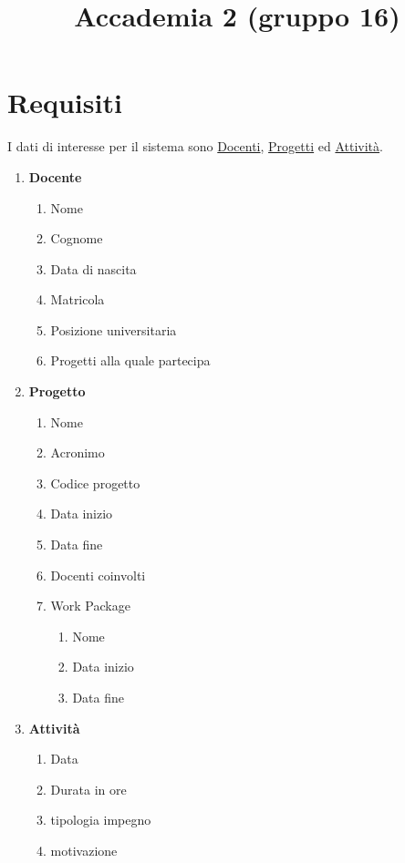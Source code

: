 \documentclass[12pt, letterpaper]{article}
\title{Accademia 2 (gruppo 16)}
\date{}
\begin{document}
\maketitle


\section{Requisiti}

I dati di interesse per il sistema sono \underline{Docenti}, \underline{Progetti} ed \underline{Attività}.
\begin{enumerate}
    \item \textbf{Docente}\begin{enumerate}
              \item Nome
              \item Cognome
              \item Data di nascita
              \item Matricola
              \item Posizione universitaria
              \item Progetti alla quale partecipa
          \end{enumerate}
    \item \textbf{Progetto}\begin{enumerate}
              \item Nome
              \item Acronimo
              \item Codice progetto
              \item Data inizio
              \item Data fine
              \item Docenti coinvolti
              \item Work Package\begin{enumerate}
                        \item Nome
                        \item Data inizio
                        \item Data fine
                    \end{enumerate}
          \end{enumerate}
    \item\textbf{Attività}\begin{enumerate}
              \item Data
              \item Durata in ore
              \item tipologia impegno
              \item motivazione
          \end{enumerate}
\end{enumerate}\newpage
\end{document}
